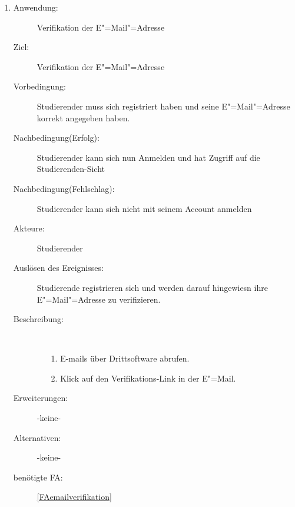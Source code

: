 \documentclass[parskip=full]{scrartcl}
\newcommand{\swtLabel}[1]{\textbf{/#1\arabic*0/}}
\begin{document}
\begin{enumerate}[label=\swtLabel{S}]
  \item \label{UCstudVerifikationEmail}
    \begin{description}
    \item[Anwendung:] Verifikation der E"=Mail"=Adresse
    \item[Ziel:] Verifikation der E"=Mail"=Adresse
    \item[Vorbedingung:] Studierender muss sich registriert haben und seine
    E"=Mail"=Adresse korrekt angegeben haben.
    \item[Nachbedingung(Erfolg):] Studierender kann sich nun Anmelden und hat
    Zugriff auf die Studierenden-Sicht
    \item[Nachbedingung(Fehlschlag):] Studierender kann sich nicht mit seinem
    Account anmelden
    \item[Akteure:] Studierender
    \item[Auslösen des Ereignisses:] Studierende registrieren sich und werden
    darauf hingewiesn ihre E"=Mail"=Adresse zu verifizieren.
    \item[Beschreibung:]~
    \begin{enumerate}
      \item[1.] E-mails über Drittsoftware abrufen.
      \item[2.] Klick auf den Verifikations-Link in der E"=Mail.      
    \end{enumerate}
    \item[Erweiterungen:] -keine-
    \item[Alternativen:] -keine-
    \item[benötigte FA:] \ref{FAemailverifikation}
      \end{description}
  

\end{enumerate}
\end{document}
